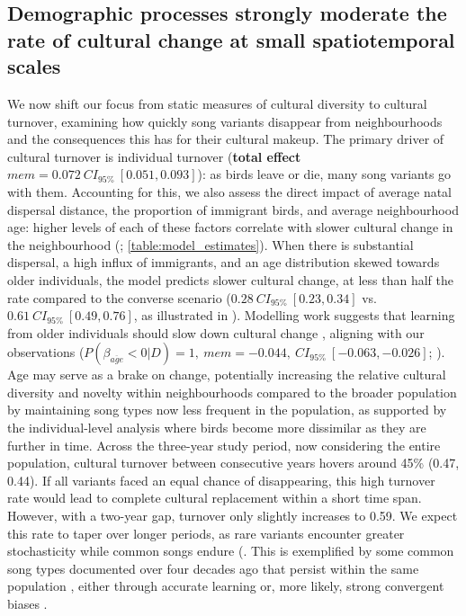 \subsection{Demographic processes strongly moderate the rate of cultural change at small spatiotemporal scales}

We now shift our focus from static measures of cultural diversity to cultural turnover, examining how quickly song variants disappear from neighbourhoods and the consequences this has for their cultural makeup. The primary driver of cultural turnover is individual turnover (\textbf{total effect} $mem = 0.072~CI_{95\%}~[0.051, 0.093]$): as birds leave or die, many song variants go with them. Accounting for this, we also assess the direct impact of average natal dispersal distance, the proportion of immigrant birds, and average neighbourhood age: higher levels of each of these factors correlate with slower cultural change in the neighbourhood (; \autoref{table:model_estimates}). When there is substantial dispersal, a high influx of immigrants, and an age distribution skewed towards older individuals, the model predicts slower cultural change, at less than half the rate compared to the converse scenario ($0.28~CI_{95\%}~[0.23, 0.34]$ vs. $0.61~CI_{95\%}~[0.49, 0.76]$, as illustrated in ).
Modelling work suggests that learning from older individuals should slow down cultural change \parencite{kirby2021}, aligning with our observations ($P(\beta_{\overline{age}} < 0 | D) = 1,~mem=-0.044,~CI_{95\%}~[-0.063, -0.026]$; ). Age may serve as a brake on change, potentially increasing the relative cultural diversity and novelty within neighbourhoods compared to the broader population by maintaining song types now less frequent in the population, as supported by the individual-level analysis where birds become more dissimilar as they are further in time.
Across the three-year study period, now considering the entire population, cultural turnover between consecutive years hovers around 45\% (0.47, 0.44). If all variants faced an equal chance of disappearing, this high turnover rate would lead to complete cultural replacement within a short time span. However, with a two-year gap, turnover only slightly increases to 0.59. We expect this rate to taper over longer periods, as rare variants encounter greater stochasticity while common songs endure (. This is exemplified by some common song types documented over four decades ago that persist within the same population \parencite{mcgregor1982b, keen2020}, either through accurate learning or, more likely, strong convergent biases \parencite{lachlan2018, tchernichovski2021, james2017, claidiere2007}.


